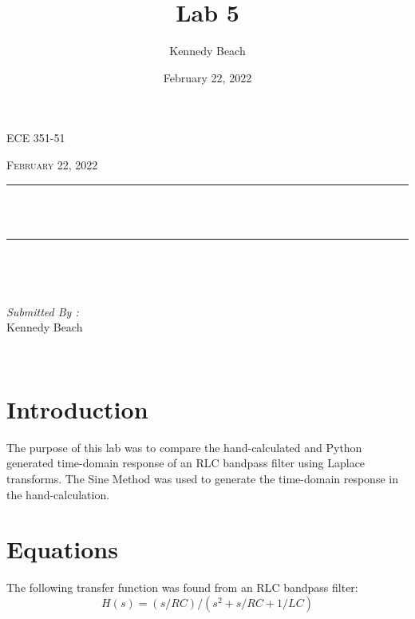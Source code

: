 \documentclass[12pt]{report}
\title{Lab 5}
\author{Kennedy Beach}
\date{February 22, 2022}
\makeatletter
\let\thetitle\@title
\makeatother
\begin{document}
\begin{titlepage}
\centering
\vspace*{0.5 cm}
\begin{center}    \textsc{\Large   ECE 351-51 }\\[2.0 cm]
\end{center}%
\textsc{\Large February 22, 2022}\\[0.5 cm] %
\rule{\linewidth}{0.2 mm} \\[0.4 cm]
{ \huge \bfseries \thetitle}\\
\rule{\linewidth}{0.2 mm} \\[1.5 cm]
\begin{minipage}{0.4\textwidth}
\begin{flushleft} \large
\end{flushleft}
\end{minipage}~
\begin{minipage}{0.4\textwidth}
\begin{flushright} \large
\emph{Submitted By :} \\
Kennedy Beach
\end{flushright}
\end{minipage}\\[2 cm]
\end{titlepage}
\tableofcontents
\pagebreak
\renewcommand{\thesection}{\arabic{section}}
\section{Introduction}
The purpose of this lab was to compare the hand-calculated and Python generated time-domain response of an RLC bandpass filter using Laplace transforms. The Sine Method was used to generate the time-domain response in the hand-calculation.
\section{Equations}
The following transfer function was found from an RLC bandpass filter:
\begin{equation}
H(s) = (s/RC)/(s^2+s/RC+1/LC)
\end{equation}
\end{document}
